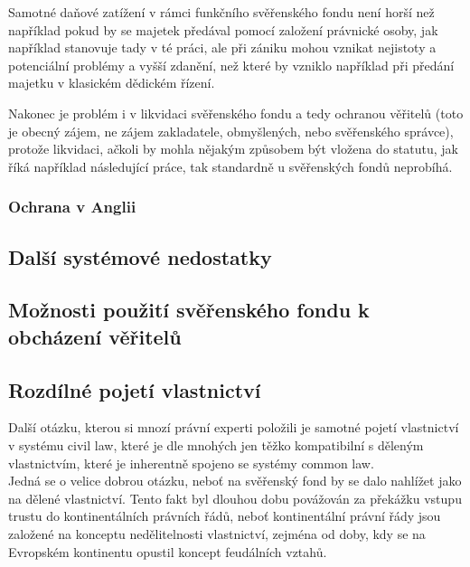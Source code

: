 \documentclass{article}
\begin{document}
Samotné daňové zatížení v rámci funkčního svěřenského fondu není horší než například pokud by se majetek předával pomocí založení právnické osoby, jak například stanovuje tady v té práci, ale při zániku mohou vznikat nejistoty a potenciální problémy a vyšší zdanění, než které by vzniklo například při předání majetku v klasickém dědickém řízení.

Nakonec je problém i v likvidaci svěřenského fondu a tedy ochranou věřitelů (toto je obecný zájem, ne zájem zakladatele, obmyšlených, nebo svěřenského správce), protože likvidaci, ačkoli by mohla nějakým způsobem být vložena do statutu, jak říká například následující práce, tak standardně u svěřenských fondů neprobíhá.

\subsubsection{Ochrana v Anglii}


\subsection{Další systémové nedostatky}

\subsection{Možnosti použití svěřenského fondu k obcházení věřitelů}
\subsection{Rozdílné pojetí vlastnictví}

Další otázku, kterou si mnozí právní experti položili je samotné pojetí vlastnictví v systému civil law, které je dle mnohých jen těžko kompatibilní s děleným vlastnictvím, které je inherentně spojeno se systémy common law.\\


Jedná se o velice dobrou otázku, neboť na svěřenský fond by se dalo nahlížet jako na dělené vlastnictví. Tento fakt byl dlouhou dobu povážován za překážku vstupu trustu do kontinentálních právních řádů, neboť kontinentální právní řády jsou založené na konceptu nedělitelnosti vlastnictví, zejména od doby, kdy se na Evropském kontinentu opustil koncept feudálních vztahů.\\
\end{document}
